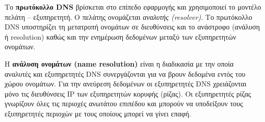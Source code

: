 Το \textbf{πρωτόκολλο DNS} βρίσκεται στο επίπεδο εφαρμογής και χρησιμοποιεί το μοντέλο πελάτη -- εξυπηρετητή. Ο πελάτης ονομάζεται \emph{αναλυτής (resolver)}. Το πρωτόκολλο DNS υποστηρίζει τη μετατροπή ονομάτων σε διευθύνσεις και το ανάστροφο (ανάλυση ή resolution) καθώς και την ενημέρωση δεδομένων μεταξύ των εξυπηρετητών ονομάτων.

Η \textbf{ανάλυση ονομάτων (name resolution)} είναι η διαδικασία με την οποία αναλυτές και εξυπηρετητές DNS συνεργάζονται για να βρουν δεδομένα εντός του χώρου ονομάτων. Για την ανεύρεση δεδομένων οι εξυπηρετητές DNS χρειάζονται μόνο τις διευθύνσεις IP των εξυπηρετητών κορυφής (ρίζας). Οι εξυπηρετητές ρίζας γνωρίζουν όλες τις περιοχές ανωτάτου επιπέδου και μπορούν να υποδείξουν τους εξυπηρετητές περιοχών με τους οποίους μπορεί να γίνει επαφή.